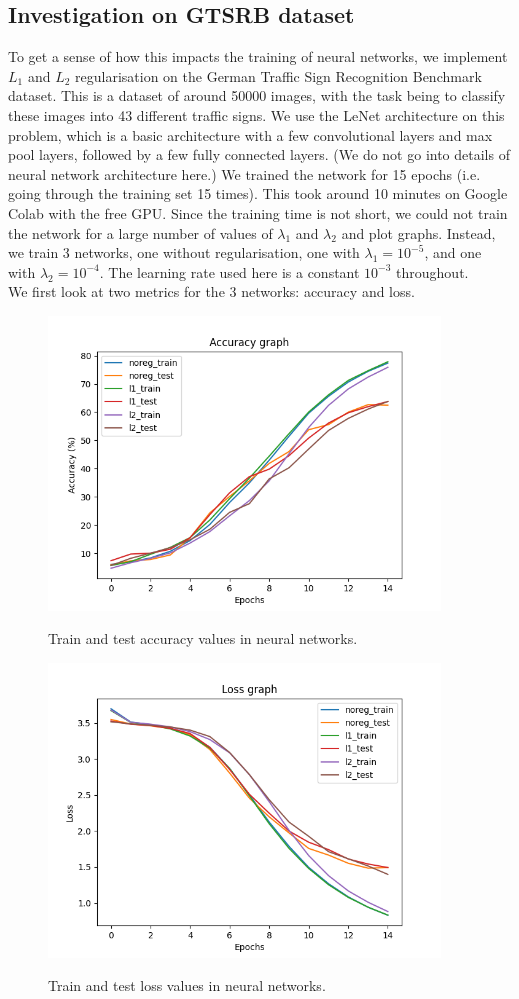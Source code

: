 \documentclass[11pt,a4paper]{article}
\begin{document}
\subsection{Investigation on GTSRB dataset}
To get a sense of how this impacts the training of neural networks, we implement $L_1$ and $L_2$ regularisation on the German Traffic Sign Recognition Benchmark dataset. This is a dataset of around 50000 images, with the task being to classify these images into 43 different traffic signs. We use the LeNet architecture on this problem, which is a basic architecture with a few convolutional layers and max pool layers, followed by a few fully connected layers. (We do not go into details of neural network architecture here.) We trained the network for 15 epochs (i.e. going through the training set 15 times). This took around 10 minutes on Google Colab with the free GPU. Since the training time is not short, we could not train the network for a large number of values of $\lambda_1$ and $\lambda_2$ and plot graphs. Instead, we train 3 networks, one without regularisation, one with $\lambda_1 = 10^{-5}$, and one with $\lambda_2 = 10^{-4}$. The learning rate used here is a constant $10^{-3}$ throughout. \\

We first look at two metrics for the 3 networks: accuracy and loss.
\begin{figure}[htbp]\centering\label{fig3}
  \includegraphics[height=78mm,angle=0]{fig3.png}
  \caption{Train and test accuracy values in neural networks.}
\end{figure}
\begin{figure}[htbp]\centering\label{fig4}
  \includegraphics[height=78mm,angle=0]{fig4.png}
  \caption{Train and test loss values in neural networks.}
\end{figure}
\end{document}
